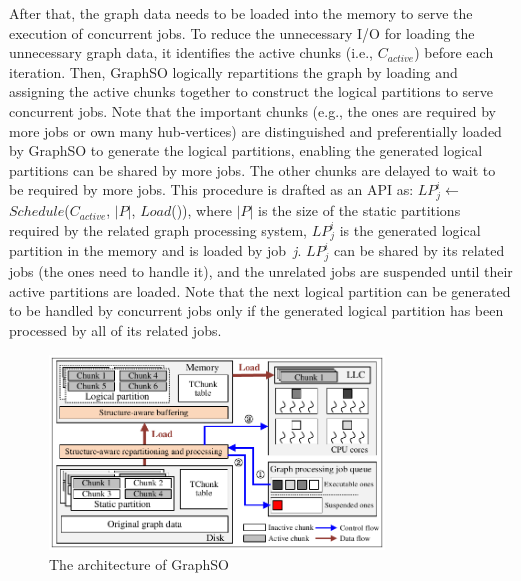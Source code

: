 \documentclass[10pt,journal,compsoc]{IEEEtran}
\begin{document}
After that, the graph data needs to be loaded into the memory to serve the execution of concurrent jobs.
To reduce the unnecessary I/O for loading the unnecessary graph data, it identifies the active chunks (i.e., $C_{active}$) before each iteration.
Then, GraphSO logically repartitions the graph by loading and assigning the active chunks together to construct the logical partitions to serve concurrent jobs.
Note that the important chunks (e.g., the ones are required by more jobs or own many hub-vertices) are distinguished and preferentially loaded by GraphSO to generate the logical partitions, enabling the generated logical partitions can be shared by more jobs. The other chunks are delayed to wait to be required by more jobs.
This procedure is drafted as an API as: $LP^i_j$$\leftarrow$$Schedule$($C_{active}$, $|P|$, $Load$()), where $|P|$ is the size of the static partitions required by the related graph processing system,
$LP^i_j$ is the generated logical partition in the memory and is loaded by job~\textit{j}. $LP^i_j$ can be shared by its related jobs (the ones need to handle it), and the unrelated jobs are suspended until their active partitions are loaded.
Note that the next logical partition can be generated to be handled by concurrent jobs only if the generated logical partition has been processed by all of its related jobs.

\begin{figure}[!t]
	\centering
	\includegraphics[width=3.5in]{Architectural.pdf}
	\vspace{-20pt}
	\caption{The architecture of GraphSO}
	\label{Architectural}
	\vspace{-20pt}
\end{figure}
\end{document}

